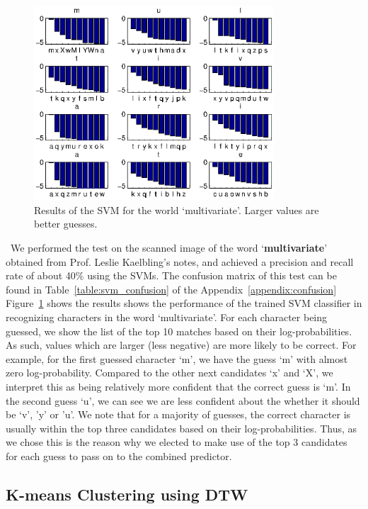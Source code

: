 \documentclass[12pt]{article}
\begin{document}
	\begin{figure}[htbp!]
	\centering
	\includegraphics[width=0.8\textwidth]{svm_result.eps}
	\caption{Results of the SVM for the world `multivariate'. Larger values are better guesses.}
	\label{figure:svm_result}
	\end{figure}
	
	\
	We performed the test on the scanned image of the word `\textbf{multivariate}' obtained from Prof. Leslie Kaelbling's notes, and achieved a precision and recall rate of about 40\% using the SVMs. The confusion matrix of this test can be found in Table~\ref{table:svm_confusion} of the Appendix~\ref{appendix:confusion}	Figure~\ref{figure:svm_result} shows the results shows the performance of the trained SVM classifier in recognizing characters in the word `multivariate'. For each character being guessed, we show the list of the top 10 matches based on their log-probabilities. As such, values which are larger (less negative) are more likely to be correct. For example, for the first guessed character `m', we have the guess `m' with almost zero log-probability. Compared to the other next candidates `x' and `X', we interpret this as being relatively more confident that the correct guess is `m'.  In the second guess `u',  we can see we are less confident about the whether it should be `v', 'y' or 'u'. We note that for a majority of guesses, the correct character is usually within the top three candidates based on their log-probabilities. Thus, as we chose this is the reason why we elected to make use of the top 3 candidates for each guess to pass on to the combined predictor.
	
	\subsection{K-means Clustering using DTW}
	
\end{document}
